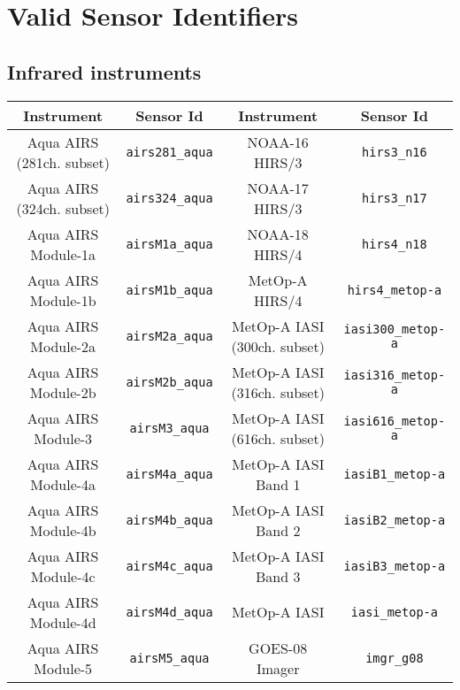 \chapter{Valid Sensor Identifiers}

\section{Infrared instruments}

\begin{table}[htp]
  \centering
  \begin{tabular}{|c|c||c|c|}
    \hline
    \sffamily\textbf{Instrument} & \sffamily\textbf{Sensor Id} & \sffamily\textbf{Instrument} & \sffamily\textbf{Sensor Id} \\
    \hline\hline
Aqua AIRS (281ch. subset) & \texttt{airs281\_aqua} & NOAA-16 HIRS/3 & \texttt{hirs3\_n16}                      \\
Aqua AIRS (324ch. subset) & \texttt{airs324\_aqua} & NOAA-17 HIRS/3 & \texttt{hirs3\_n17}                      \\
Aqua AIRS Module-1a & \texttt{airsM1a\_aqua}       & NOAA-18 HIRS/4 & \texttt{hirs4\_n18}                      \\
Aqua AIRS Module-1b & \texttt{airsM1b\_aqua}       & MetOp-A HIRS/4 & \texttt{hirs4\_metop-a}                  \\
Aqua AIRS Module-2a & \texttt{airsM2a\_aqua}       & MetOp-A IASI (300ch. subset) & \texttt{iasi300\_metop-a}  \\
Aqua AIRS Module-2b & \texttt{airsM2b\_aqua}       & MetOp-A IASI (316ch. subset)  & \texttt{iasi316\_metop-a} \\
Aqua AIRS Module-3  & \texttt{airsM3\_aqua}        & MetOp-A IASI (616ch. subset)  & \texttt{iasi616\_metop-a} \\
Aqua AIRS Module-4a & \texttt{airsM4a\_aqua}       & MetOp-A IASI Band 1 & \texttt{iasiB1\_metop-a}            \\
Aqua AIRS Module-4b & \texttt{airsM4b\_aqua}       & MetOp-A IASI Band 2 & \texttt{iasiB2\_metop-a}            \\
Aqua AIRS Module-4c & \texttt{airsM4c\_aqua}       & MetOp-A IASI Band 3 & \texttt{iasiB3\_metop-a}            \\
Aqua AIRS Module-4d & \texttt{airsM4d\_aqua}       & MetOp-A IASI & \texttt{iasi\_metop-a}                     \\
Aqua AIRS Module-5  & \texttt{airsM5\_aqua}        & GOES-08 Imager & \texttt{imgr\_g08}                       \\

\end{tabular}
\end{table}
